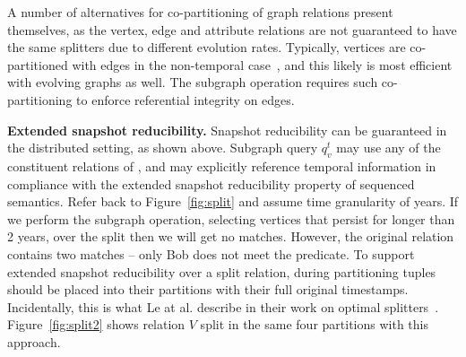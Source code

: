 A number of alternatives for co-partitioning of graph relations
present themselves, as the vertex, edge and attribute relations are
not guaranteed to have the same splitters due to different evolution
rates.  Typically, vertices are co-partitioned with edges in the
non-temporal case~\cite{DBLP:conf/osdi/GonzalezXDCFS14}, and this
likely is most efficient with evolving graphs as well.  The subgraph
operation requires such co-partitioning to enforce referential
integrity on edges.




{\bf Extended snapshot reducibility.}  Snapshot reducibility can be
guaranteed in the distributed setting, as shown above.  Subgraph query $q^t_v$ may use any of the constituent
relations of \tve, and may explicitly reference temporal information
in compliance with the extended snapshot reducibility property of
sequenced semantics.  Refer back to Figure~\ref{fig:split} and assume
time granularity of years.  If we perform the subgraph operation,
selecting vertices that persist for longer than 2 years, over the
split then we will get no matches.  However, the original relation
contains two matches -- only Bob does not
meet the predicate.  To support extended snapshot reducibility over a
split relation, during partitioning tuples should be placed into their
partitions with their full original timestamps.  Incidentally, this is
what Le at al. describe in their work on optimal
splitters~\cite{Le2013}.  Figure~\ref{fig:split2} shows relation $V$
split in the same four partitions with this approach.

